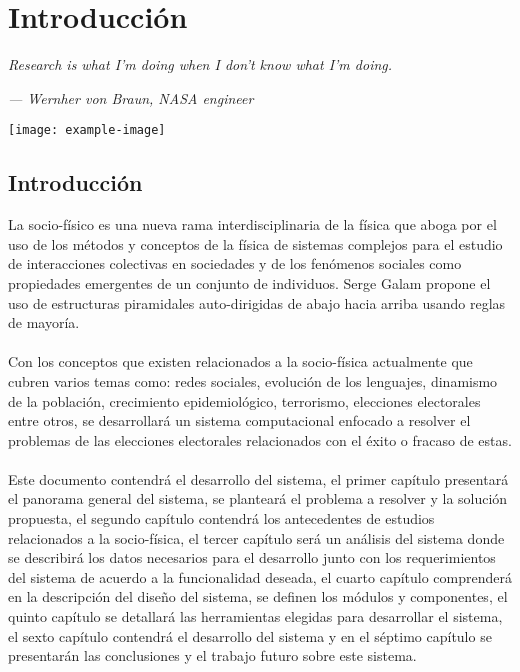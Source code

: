 \newpage 
\chapter*{Introducción}

\epigraph{\textit{Research is what I'm doing when I don't know what I'm doing.   
	}}{\textit{— Wernher von Braun, NASA engineer}}
	\vspace*{8cm}
	\begin{center}
		\centering
		\texttt{[image: example-image]}
    \end{center}
\thispagestyle{empty}
\newpage
\vspace*{2cm}

\section*{Introducción}
La socio-físico es una nueva rama interdisciplinaria de la física que aboga por el uso de los métodos y conceptos de la física de sistemas complejos para el estudio de interacciones colectivas en sociedades y de los fenómenos sociales como propiedades emergentes de un conjunto de individuos. Serge Galam propone el uso de estructuras piramidales auto-dirigidas de abajo hacia arriba usando reglas de mayoría. \cite{MarioH.RamirezDiaz2014, Galam.1986, Galam1990, Galam1991, Galam2000}
\\
\\
Con los conceptos que existen relacionados a la socio-física actualmente que cubren varios temas como: redes sociales, evolución de los lenguajes, dinamismo de la población, crecimiento epidemiológico, terrorismo, elecciones electorales entre otros, se desarrollará un sistema computacional enfocado a resolver el problemas de las elecciones electorales relacionados con el éxito o fracaso de estas.
\\
\\
Este documento contendrá el desarrollo del sistema, el primer capítulo presentará el panorama general del sistema, se planteará el problema a resolver y la solución propuesta, el segundo capítulo contendrá los antecedentes de estudios relacionados a la socio-física, el tercer capítulo será un análisis del sistema donde se describirá los datos necesarios para el desarrollo junto con los requerimientos del sistema de acuerdo a la funcionalidad deseada, el cuarto capítulo comprenderá en la descripción del diseño del sistema, se definen los módulos y componentes, el quinto capítulo se detallará las herramientas elegidas para desarrollar el sistema, el sexto capítulo contendrá el desarrollo del sistema y en el séptimo capítulo se presentarán las conclusiones y el trabajo futuro sobre este sistema. 

